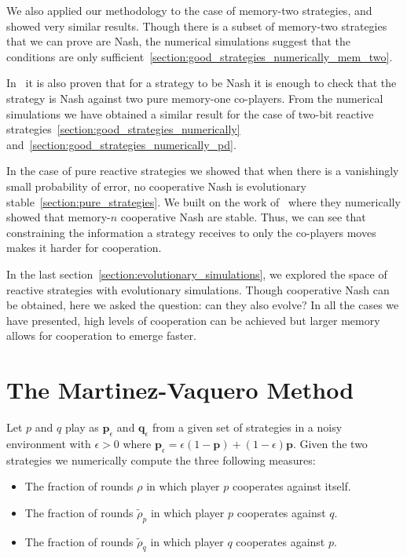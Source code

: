 \documentclass{article}
\theoremstyle{definition}
\begin{document}
We also applied our methodology to the case of memory-two strategies, and showed
very similar results. Though there is a subset of memory-two strategies that we
can prove are Nash, the numerical simulations suggest that the conditions are
only sufficient~\ref{section:good_strategies_numerically_mem_two}.

In~\citep{akin:EGADS:2016} it is also proven that for a strategy to be Nash it
is enough to check that the strategy is Nash against two pure memory-one
co-players. From the numerical simulations we have obtained a similar result for
the case of two-bit reactive
strategies~\ref{section:good_strategies_numerically}
and~\ref{section:good_strategies_numerically_pd}.

In the case of pure reactive strategies we showed that when there is a
vanishingly small probability of error, no cooperative Nash is evolutionary
stable~\ref{section:pure_strategies}. We
built on the work of~\citep{hilbe:PNAS:2017} where they numerically showed that
memory-\(n\) cooperative Nash are stable. Thus, we can see that constraining
the information a strategy receives to only the co-players moves makes it harder
for cooperation.

In the last section~\ref{section:evolutionary_simulations}, we explored the
space of reactive strategies with evolutionary simulations. Though cooperative
Nash can be obtained, here we asked the question: can they also evolve? In all
the cases we have presented, high levels of cooperation can be achieved but
larger memory allows for cooperation to emerge faster.


\appendix

\section{The Martinez-Vaquero Method}\label{section:matrinez_vaquero_method}

Let \(p\) and \(q\) play as \(\mathbf{p}_{\epsilon}\) and
\(\mathbf{q}_{\epsilon}\) from a given set of strategies in a noisy environment
with \(\epsilon > 0\) where \(\mathbf{p}_{\epsilon} = \epsilon(1 - \mathbf{p}) +
(1 - \epsilon)\mathbf{p} \). Given the two strategies we numerically compute
the three following measures:


\begin{itemize}
  \item The fraction of rounds \(\rho\) in which player \(p\) cooperates against itself.
  \item The fraction of rounds \(\tilde{\rho}_p\) in which player \(p\) cooperates against \(q\).
  \item The fraction of rounds \(\tilde{\rho}_q\) in which player \(q\) cooperates against \(p\).
\end{itemize}
\end{document}

